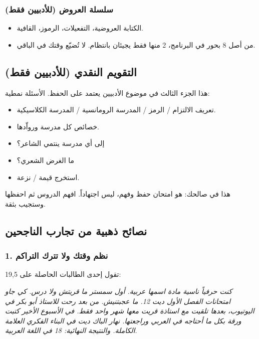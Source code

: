 \documentclass[12pt,a4paper]{book}
\newcommand{\quoteAr}[1]{%
	\begin{myquote}
		\itshape #1
	\end{myquote}
}
\begin{document}
	\subsubsection*{سلسلة العروض (للأدبيين فقط)}
	
	\begin{itemize}
		\item الكتابة العروضية، التفعيلات، الرموز، القافية.
		\item من أصل 8 بحور في البرنامج، 2 منها فقط يجيئان بانتظام. لا تُضيّع وقتك في الباقي.
	\end{itemize}
	
	\subsection{التقويم النقدي (للأدبيين فقط)}
	
	هذا الجزء الثالث في موضوع الأدبيين يعتمد على الحفظ. الأسئلة نمطية:
	\begin{itemize}
		\item تعريف الالتزام / الرمز / المدرسة الرومانسية / المدرسة الكلاسيكية.
		\item خصائص كل مدرسة ورواّدها.
		\item إلى أي مدرسة ينتمي الشاعر؟
		\item ما الغرض الشعري؟
		\item استخرج قيمة / نزعة.
	\end{itemize}
	
	هذا في صالحك: هو امتحان حفظ وفهم، ليس اجتهاداً. افهم الدروس ثم احفظها وستجيب بثقة.
	
	\subsection{نصائح ذهبية من تجارب الناجحين}
	\label{sec:random-tips13}
	
	\subsubsection*{1. نظم وقتك ولا تترك التراكم}
	تقول إحدى الطالبات الحاصلة على 19,5: 
	\quoteAr{كنت حرفياً ناسية مادة اسمها عربية. أول سمستر ما قريتش ولا درس. كي جاو امتحانات الفصل الأول ديت 12. ما عجبتنيش. من بعد رحت للاستاذ أبو بكر في اليوتيوب، بعدها تلقيت مع استاذة قريت معها شهر  واحد فقط. في الأسبوع الأخير كتبت ورقة بكل ما أحتاجه في العربي وراجعتها. نهار الباك ديت في البناء الفكري العلامة الكاملة. والنتيجة النهائية: 18 في اللغة العربية.}
	
\end{document}
